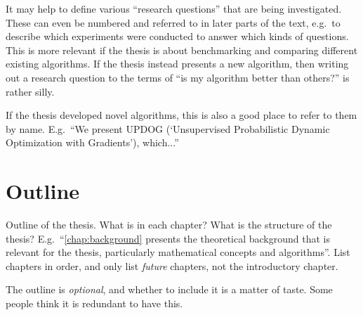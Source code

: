 It may help to define various ``research questions'' that are being investigated.
These can even be numbered and referred to in later parts of the text, e.g.\ to describe which experiments were conducted to answer which kinds of questions.
This is more relevant if the thesis is about benchmarking and comparing different existing algorithms.
If the thesis instead presents a new algorithm, then writing out a research question to the terms of ``is my algorithm better than others?'' is rather silly.

If the thesis developed novel algorithms, this is also a good place to refer to them by name.
E.g.\ ``We present UPDOG (`Unsupervised Probabilistic Dynamic Optimization with Gradients'), which...''

\section{Outline}

Outline of the thesis.
What is in each chapter? What is the structure of the thesis?
E.g.\ ``\cref{chap:background} presents the theoretical background that is relevant for the thesis, particularly mathematical concepts and algorithms''.
List chapters in order, and only list \emph{future} chapters, not the introductory chapter.

The outline is \emph{optional}, and whether to include it is a matter of taste.
Some people think it is redundant to have this.
